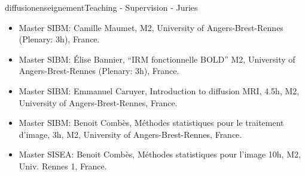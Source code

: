 \documentclass{ra2018}
\begin{document}
\begin{module}{diffusion}{enseignement}{Teaching - Supervision - Juries}
\begin{itemize}
    \item Master SIBM: Camille Maumet, M2, University of Angers-Brest-Rennes (Plenary: 3h), France.
    \item Master SIBM: Élise Bannier, ``IRM fonctionnelle BOLD'' M2, University of Angers-Brest-Rennes (Plenary: 3h), France.
    \item Master SIBM: Emmanuel Caruyer, Introduction to diffusion MRI, 4.5h, M2, University of Angers-Brest-Rennes, France.
     \item Master SIBM: Benoit Combès, Méthodes statistiques pour le traitement d'image, 3h, M2, University of Angers-Brest-Rennes, France.
    \item Master SISEA: Benoit Combès, Méthodes statistiques pour l'image 10h, M2, Univ. Rennes 1, France.
 \end{itemize}



%


\end{module}
\end{document}
